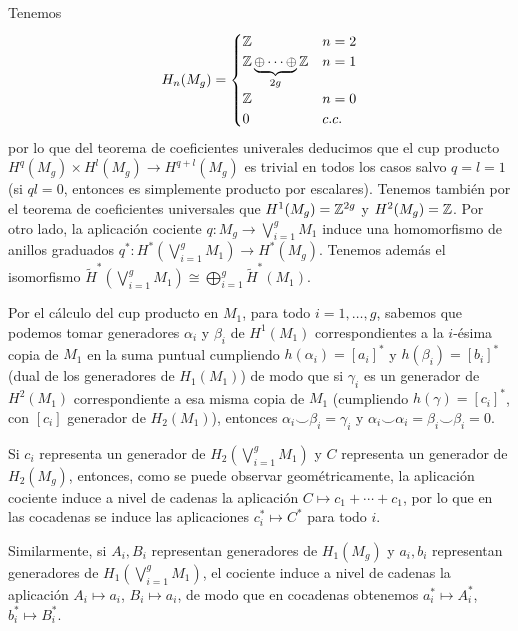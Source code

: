 \documentclass[twoside]{article}
\begin{document}
\begin{solucion}

Tenemos 
\[
H_n(M_g)=\begin{cases}
\mathbb{Z} & n=2\\
\mathbb{Z}\underbrace{\oplus\cdots\oplus}_{2g}\mathbb{Z} & n=1\\
\mathbb{Z} & n=0\\
0 & c.c.
\end{cases}
\]
por lo que del teorema de coeficientes univerales deducimos que el cup producto $H^q(M_g)\times H^l(M_g)\to H^{q+l}(M_g)$ es trivial en todos los casos salvo $q=l=1$ (si $ql=0$, entonces es simplemente producto por escalares). Tenemos también por el teorema de coeficientes universales que $H^1(M_g)=\mathbb{Z}^{2g}$ y $H^2(M_g)=\mathbb{Z}$. Por otro lado, la aplicación cociente $q:M_g\to\bigvee_{i=1}^g M_1$ induce una homomorfismo de anillos graduados $q^*:H^*(\bigvee_{i=1}^g M_1)\to H^*(M_g)$. Tenemos además el isomorfismo $\widetilde{H}^*(\bigvee_{i=1}^g M_1)\cong\bigoplus_{i=1}^g \widetilde{H}^*(M_1)$. 

Por el cálculo del cup producto en $M_1$, para todo $i=1,\dots, g$, sabemos que podemos tomar generadores $\alpha_i$ y $\beta_i$ de $H^1(M_1)$ correspondientes a la $i$-ésima copia de $M_1$ en la suma puntual cumpliendo $h(\alpha_i)=[a_i]^*$ y $h(\beta_i)=[b_i]^*$ (dual de los generadores de $H_1(M_1)$) de modo que si $\gamma_i$ es un generador de $H^2(M_1)$ correspondiente a esa misma copia de $M_1$ (cumpliendo $h(\gamma)=[c_i]^*$, con $[c_i]$ generador de $H_2(M_1)$), entonces $\alpha_i\smile \beta_i=\gamma_i$ y $\alpha_i\smile \alpha_i=\beta_i\smile \beta_i=0$. 

Si $c_i$ representa un generador de $H_2(\bigvee_{i=1}^g M_1)$ y $C$ representa un generador de $H_2(M_g)$, entonces, como se puede observar geométricamente, la aplicación cociente induce a nivel de cadenas la aplicación $C\mapsto c_1+\cdots+c_1$, por lo que en las cocadenas se induce las aplicaciones $c_i^*\mapsto C^*$ para todo $i$. 

Similarmente, si $A_i,B_i$ representan generadores de $H_1(M_g)$ y $a_i,b_i$ representan generadores de $H_1(\bigvee_{i=1}^g M_1)$, el cociente induce a nivel de cadenas la aplicación $A_i\mapsto a_i$, $B_i\mapsto a_i$, de modo que en cocadenas obtenemos $a_i^*\mapsto A_i^*$, $b_i^*\mapsto B_i^*$. 


\end{solucion}
\end{document}
